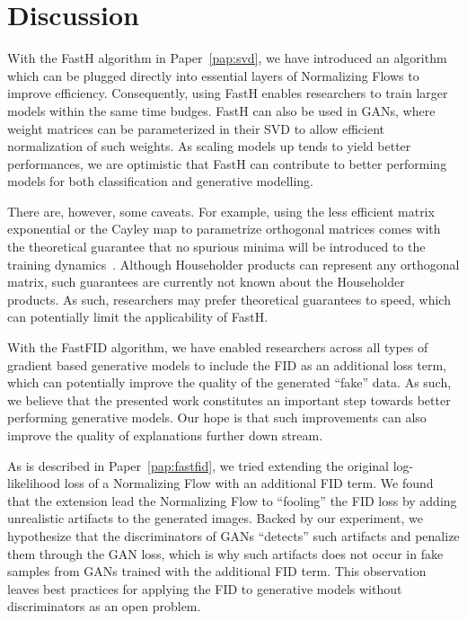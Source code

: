 \documentclass[11pt,a4paper,twoside,openright,final]{memoir}
\newcommand*{\paperref}[1]{Paper~\hyperref[#1]{\ref{#1}}}
\begin{document}
 
\section{Discussion}\label{sec:nn-discussion}

With the FastH algorithm in \paperref{pap:svd}, we have introduced an algorithm which can be plugged directly into essential layers of Normalizing Flows to improve efficiency.
Consequently, using FastH enables researchers to train larger models within the same time budges.
FastH can also be used in GANs, where weight matrices can be parameterized in their SVD to allow efficient normalization of such weights.
As scaling models up tends to yield better performances, we are optimistic that FastH can contribute to better performing models for both classification and generative modelling.

There are, however, some caveats. 
For example, using the less efficient matrix exponential or the Cayley map to parametrize orthogonal matrices comes with the theoretical guarantee that no spurious minima will be introduced to the training dynamics~\cite{matrixexp1}.  
Although Householder products can represent any orthogonal matrix, such guarantees are currently not known about the Householder products. 
As such, researchers may prefer theoretical guarantees to speed, which can potentially limit the applicability of FastH.

With the FastFID algorithm, we have enabled researchers across all types of gradient based generative models to include the FID as an additional loss term, which can potentially improve the quality of the generated ``fake'' data.
As such, we believe that the presented work constitutes an important step towards better performing generative models.
Our hope is that such improvements can also improve the quality of explanations further down stream. 

As is described in \paperref{pap:fastfid}, we tried extending the original log-likelihood loss of a Normalizing Flow with an additional FID term.
We found that the extension lead the Normalizing Flow to ``fooling'' the FID loss by adding unrealistic artifacts to the generated images. 
Backed by our experiment, we hypothesize that the discriminators of GANs ``detects'' such artifacts and penalize them through the GAN loss, which is why such artifacts does not occur in fake samples from GANs trained with the additional FID term.
This observation leaves best practices for applying the FID to generative models without discriminators as an open problem.
\end{document}
